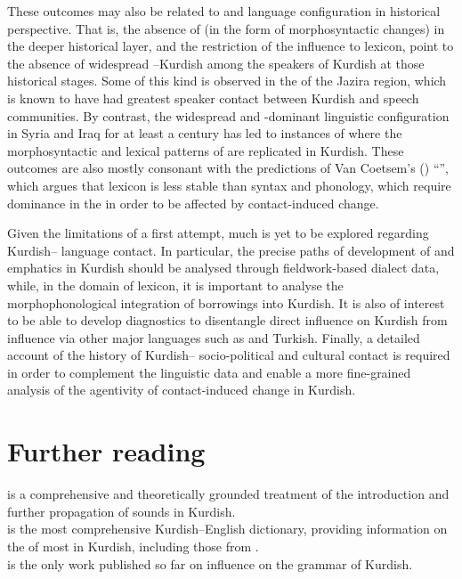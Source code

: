 \documentclass[output=paper]{langsci/langscibook}
\begin{document}
These outcomes may also be related to  and language configuration in historical perspective. That is, the absence of  (in the form of morphosyntactic changes) in the deeper historical layer, and the restriction of the influence to lexicon, point to the absence of widespread –Kurdish  among the speakers of Kurdish at those historical stages. Some  of this kind is observed in the  of the Jazira region, which is known to have had greatest speaker contact between Kurdish and  speech communities. By contrast, the widespread  and -dominant linguistic configuration in Syria and Iraq for at least a century has led to instances of  where the morphosyntactic and lexical patterns of  are replicated in Kurdish. These outcomes are also mostly consonant with the predictions of Van Coetsem’s (\citeyear{VanCoetsem1988,VanCoetsem2000}) “”, which argues that lexicon is less stable than syntax and phonology, which require dominance in the  in order to be affected by contact-induced change.    

Given the limitations of a first attempt, much is yet to be explored regarding Kurdish– language contact. In particular, the precise paths of development of  and emphatics in Kurdish should be analysed through fieldwork-based  dialect data, while, in the domain of lexicon, it is important to analyse the morphophonological integration of borrowings into Kurdish. It is also of interest to be able to develop diagnostics to disentangle direct  influence on Kurdish from influence via other major languages such as  and  {Turkish}. Finally, a detailed account of the history of Kurdish– socio-political and cultural contact is required in order to complement the linguistic data and enable a more fine-grained analysis of the agentivity of contact-induced change in Kurdish.      

\section*{Further reading}
\citet{Barryforthcoming} is a comprehensive and theoretically grounded treatment of the introduction and further propagation of  sounds in Kurdish.\\ 
\citet{Chyet2003} is the most comprehensive Kurdish–English dictionary,  providing information on the  of most  in Kurdish, including those from .\\
\citet{Tsabolov1994} is the only work published so far on  influence on the grammar of Kurdish. 
\end{document}
